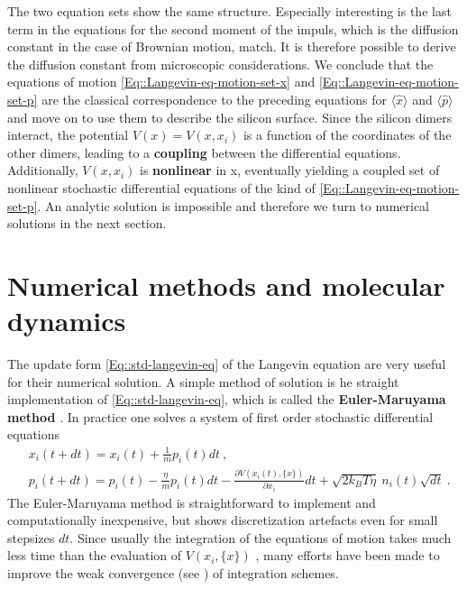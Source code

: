 	The two equation sets show the same structure. Especially interesting is the last term in the equations for the second moment of the impuls, which is the diffusion constant in the case of Brownian motion, match. It is therefore possible to derive the diffusion constant from microscopic considerations. We conclude that the equations of motion \autoref{Eq::Langevin-eq-motion-set-x} and \autoref{Eq::Langevin-eq-motion-set-p} are the classical correspondence to the preceding equations for $\langle \hat{x} \rangle$ and $\langle \hat{p} \rangle$ and move on to use them to describe the silicon surface. Since the silicon dimers interact, the potential $V(x) =	V(x, {x_i})$ is a function of the coordinates of the other dimers, leading to a \textbf{coupling} between the differential equations. Additionally, $V(x, {x_i})$ is \textbf{nonlinear} in x, eventually yielding a coupled set of nonlinear stochastic differential equations of the kind of \autoref{Eq::Langevin-eq-motion-set-p}. An analytic solution is impossible and therefore we turn to numerical solutions in the next section. 
	\section{Numerical methods and molecular dynamics} \label{Section::Numerical-methods}
	The update form \autoref{Eq::std-langevin-eq} of the Langevin equation are very useful for their numerical solution. A simple method of solution is he straight implementation of \autoref{Eq::std-langevin-eq}, which is called the \textbf{Euler-Maruyama method} \cite{kloeden1992stochastic}. In practice one solves a system of first order stochastic differential equations
	\begin{align}
		&x_i(t + dt) = x_i(t)	+ \frac{1}{m} p_i(t) dt ~, \\
		&p_i(t + dt) =	p_i(t) - \frac{\eta}{m} p_i(t) dt - \frac{\partial V(x_i(t), \{x\})}{\partial x_i} dt + \sqrt{2 k_B T \eta} ~ n_i(t) \sqrt{dt} ~.
	\end{align}
	The Euler-Maruyama method is straightforward to implement and computationally inexpensive, but shows discretization artefacts even for small stepsizes $dt$. Since usually the integration of the equations of motion takes much less time than the evaluation of $V(x_i, \{x\})$ \cite{frenkel2023understanding}, many efforts have been made to improve the weak convergence (see \cite{kloeden1992stochastic}) of integration schemes. \\
	
